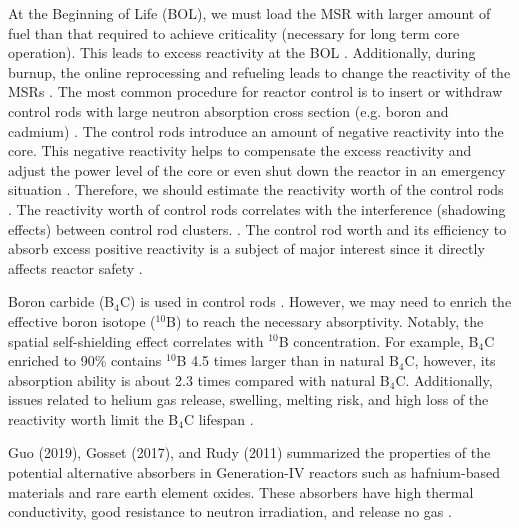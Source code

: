 At the Beginning of Life (BOL), we must load the MSR with larger amount of fuel than that required to achieve criticality (necessary for long term core operation). This leads to excess reactivity at the BOL \cite{duderstadt650nuclear}. Additionally, during burnup, the online reprocessing and refueling leads to change the reactivity of the MSRs \cite{ashraf2019whole_core}. The most common procedure for reactor control is to insert or withdraw control rods with large neutron absorption cross section (e.g. boron and cadmium) \cite{duderstadt650nuclear}. The control rods introduce an amount of negative reactivity into the core. This negative reactivity helps to compensate the excess reactivity and adjust the power level of the core or even shut down the reactor in an emergency situation \cite{glasstone1967nuclear}. Therefore, we should estimate the reactivity worth of the control rods \cite{varvayanni2009estimation,fadaei2009control,aoyama2007core,bretscher1997computing}. The reactivity worth of control rods correlates with the interference (shadowing effects) between control rod clusters. \cite{girardin2008development,vcerba2017optimization}. 
The control rod worth and its efficiency to absorb excess positive reactivity is a subject of major interest since it directly affects reactor safety \cite{liu2018criticality,atkinson2019small,vcerba2017optimization,do2019criticality,guo2019advanced,varvayanni2009estimation}.

Boron carbide (B$_4$C) is used in control rods \cite{zhong2019preliminary,steinbruck2010degradation,dunner1984absorber}. However, we may need to enrich the effective boron isotope ($^{10}$B) to reach the necessary absorptivity. Notably, the spatial self-shielding effect correlates with $^{10}$B concentration.
For example, B$_4$C enriched to 90\% contains $^{10}$B 4.5 times larger than in natural B$_4$C, however, its absorption ability is about 2.3 times compared with natural B$_4$C. Additionally, issues related to helium gas release, swelling, melting risk, and high loss of the reactivity worth limit the B$_4$C lifespan \cite{guo2019optimized}.

Guo (2019), Gosset (2017), and Rudy (2011) summarized the properties of the potential alternative absorbers in Generation-IV reactors such as hafnium-based materials and rare earth element oxides. These absorbers have high thermal conductivity, good resistance to neutron irradiation, and release no gas \cite{guo2019optimized,gosset2017absorber,konings2011comprehensive}.

